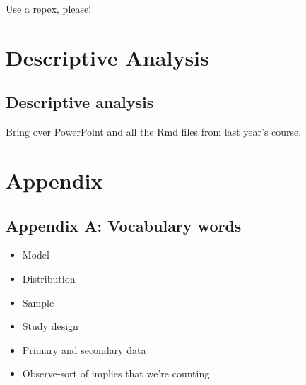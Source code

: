 \documentclass[]{book}
\providecommand{\tightlist}{%
  \setlength{\itemsep}{0pt}\setlength{\parskip}{0pt}}
\begin{document}
Use a repex, please!

\hypertarget{part-descriptive-analysis}{%
\part{Descriptive Analysis}\label{part-descriptive-analysis}}

\hypertarget{descriptive-analysis}{%
\chapter{Descriptive analysis}\label{descriptive-analysis}}

Bring over PowerPoint and all the Rmd files from last year's course.

\hypertarget{part-appendix}{%
\part{Appendix}\label{part-appendix}}

\hypertarget{appendix-a-vocabulary-words}{%
\chapter*{Appendix A: Vocabulary words}\label{appendix-a-vocabulary-words}}

\begin{itemize}
\tightlist
\item
  Model\\
\item
  Distribution\\
\item
  Sample\\
\item
  Study design\\
\item
  Primary and secondary data\\
\item
  Observe-sort of implies that we're counting
\end{itemize}


\end{document}

